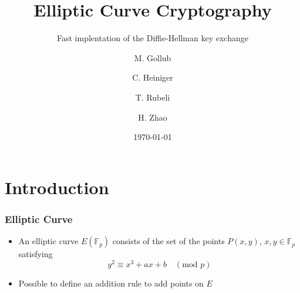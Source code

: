 \documentclass{beamer}
\title{Elliptic Curve Cryptography}
\subtitle{Fast implentation of the Diffie-Hellman key exchange}
\author{M. Gollub \and C. Heiniger \and T. Rubeli \and H. Zhao}
\institute{ETH}
\date{\today}
\begin{document}
  \begin{frame}[plain]
  \titlepage
  \end{frame}
  \section{Introduction}
  \setcounter{subsection}{1}
  \begin{frame}
  \frametitle{Elliptic Curve}
  \begin{itemize}
  \item{
  An elliptic curve $E(\mathbb{F}_p)$ consists of the set of the points $P(x,y)$, $x,y \in \mathbb{F}_p$ satisfying
  \begin{equation*}
  y^2 \equiv x^3 + ax + b \quad (\text{mod } p)
  \end{equation*}
  }
  \item{
  Possible to define an addition rule to add points on $E$
  }
  \end{itemize}
  \end{frame}
\end{document}
